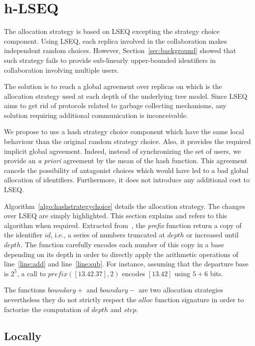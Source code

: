 
\section{h-LSEQ}
\label{sec:proposal}

The \NAME{} allocation strategy is based on LSEQ excepting the strategy choice
component. Using LSEQ, each replica involved in the collaboration makes
independent random choices. However, Section~\ref{sec:background} showed that
such strategy fails to provide sub-linearly upper-bounded identifiers in
collaboration involving multiple users.

The solution is to reach a global agreement over replicas on which is the
allocation strategy used at each depth of the underlying tree model. Since LSEQ
aims to get rid of protocols related to garbage collecting mechanisms, any
solution requiring additional communication is inconceivable.

We propose to use a hash strategy choice component which have the same local
behaviour than the original random strategy choice. Also, it provides the
required implicit global agreement. Indeed, instead of synchronizing the set of
users, we provide an \emph{a priori} agreement by the mean of the hash
function. This agreement cancels the possibility of antagonist choices which
would have led to a bad global allocation of identifiers. Furthermore, it does
not introduce any additional cost to LSEQ.



Algorithm~\ref{algo:hashstrategychoice} details the \NAME{} allocation
strategy. The changes over LSEQ are simply highlighted. This section explains
and refers to this algorithm when required. Extracted
from~\cite{nedelec2013lseq}, the \emph{prefix} function return a copy of the
identifier $id$, i.e., a series of numbers truncated at $depth$ or increased
until $depth$. The function carefully encodes each number of this copy in a
base depending on its depth in order to directly apply the arithmetic
operations of line~\ref{line:add} and line~\ref{line:sub}. For instance,
assuming that the departure base is $2^5$, a call to $prefix([13.42.37],2)$
encodes $[13.42]$ using $5+6$ bits.

The functions $boundary+$ and $boundary-$ are two allocation strategies
nevertheless they do not strictly respect the $alloc$ function signature
in order to factorize the computation of $depth$ and $step$.


\subsection{Locally}

